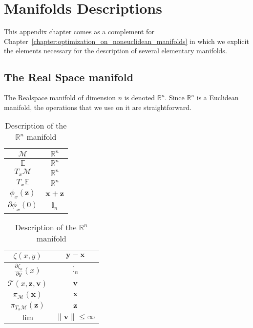 

\chapter{Manifolds Descriptions}
\label{appendix:manifolds}

\graphicspath{{Appendix2-Manifolds/Figs/}}

This appendix chapter comes as a complement for Chapter~\ref{chapter:optimization_on_noneuclidean_manifolds} in which we explicit the elements necessary for the description of several elementary manifolds.

\section{The Real Space manifold}
\label{sec:the_real_space}
The Realspace manifold of dimension $n$ is denoted $\mathbb{R}^n$.
Since $\mathbb{R}^n$ is a Euclidean manifold, the operations that we use on it are straightforward.

\begin{table} [H]
\caption{Description of the $\mathbb{R}^n$ manifold}
\centering
\begin{tabular}{cc}
  \toprule
  $\mathcal{M}$ & $\mathbb{R}^n$ \\
  \midrule
  $\mathbb{E}$ & $\mathbb{R}^n$ \\
  \midrule
  $T_x\mathcal{M}$ & $\mathbb{R}^n$ \\
  \midrule
  $T_x\mathbb{E}$ & $\mathbb{R}^n$ \\
  \midrule
  $\phi_x(\mathbf{z})$ & $\mathbf{x} + \mathbf{z}$ \\
  \midrule
  $\partial \phi_x(0)$ & $\mathbb{I}_n$ \\
  \bottomrule
\end{tabular}
\quad
\begin{tabular}{cc}
  \toprule
  $\zeta(x,y)$ & $\mathbf{y} - \mathbf{x}$ \\
  \midrule
  $\frac{\partial \zeta_x}{\partial y}(x)$ & $\mathbb{I}_n$ \\
  \midrule
  $\mathcal{T}(x,\mathbf{z}, \mathbf{v})$ & $\mathbf{v}$ \\
  \midrule
  $\pi_\mathcal{M}(\mathbf{x})$ & $\mathbf{x}$ \\
  \midrule
  $\pi_{T_x\mathcal{M}}(\mathbf{z})$ & $\mathbf{z}$ \\
  \midrule
  $\lim$ & $\|\mathbf{v}\| \leq \infty$ \\
  \bottomrule
\end{tabular}
\end{table}
